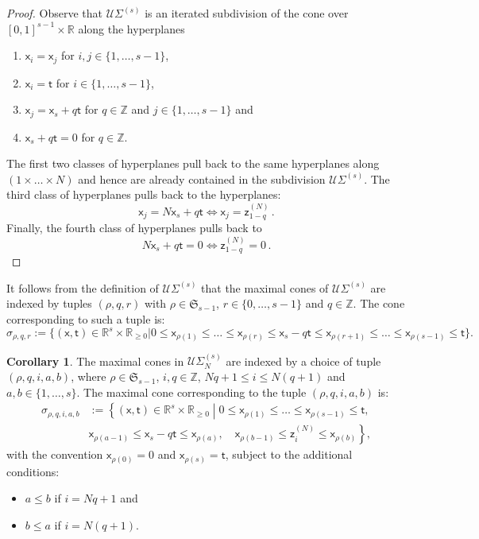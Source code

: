 \documentclass[11pt]{article}
\newcommand{\RR}{\mathbb{R}}
\theoremstyle{definition}
\newtheorem{corollary}[definition]{Corollary}
\begin{document}
\begin{proof}
	Observe that $\mathcal U\Sigma^{(s)}$ is an iterated subdivision of the
	cone over $[0,1]^{s-1}\times \mathbb{R}$ along the hyperplanes
	\begin{enumerate}[label = (\alph*)]
		\item $\mathsf{x}_i=\mathsf{x}_j$ for $i,j\in \{1,\dots,s-1\}$,
		\item $\mathsf{x}_i=\mathsf{t}$ for $i\in \{1,\dots,s-1\}$,
		\item $\mathsf{x}_j=\mathsf{x}_s+q\mathsf{t}$ for $q\in \mathbb{Z}$ and $j\in \{1,\dots,s-1\}$ and
		\item $\mathsf{x}_s+q\mathsf{t}=0$ for $q\in \mathbb{Z}$.
	\end{enumerate}
	The first two classes of hyperplanes pull back to the same
	hyperplanes along $(1\times\dots\times N)$ and hence are already
	contained in the subdivision $\mathcal U\Sigma^{(s)}$. The third class
	of hyperplanes pulls back to the hyperplanes:
	$$\mathsf{x}_j=N\mathsf{x}_s+q\mathsf{t}\Leftrightarrow \mathsf{x}_j=\mathsf{z}_{1-q}^{(N)}\,.$$
	Finally, the fourth class of hyperplanes pulls back to
	$$N\mathsf{x}_s+q\mathsf{t}=0\Leftrightarrow \mathsf{z}_{1-q}^{(N)}=0\,.$$
\end{proof}

It follows from the definition of $\mathcal U\Sigma^{(s)}$
that the maximal cones of $\mathcal U\Sigma^{(s)}$ are
indexed by tuples $(\rho,q,r)$ with $\rho\in \mathfrak S_{s-1}$, $r\in \{0,\dots,s-1\}$ and $q\in \mathbb{Z}$.
The cone corresponding to such a tuple is:
$$\sigma_{\rho,q,r}:=\{(\mathsf{x},\mathsf{t})\in \mathbb{R}^{s}\times \mathbb{R}_{\ge 0}|0\le \mathsf{x}_{\rho(1)}\le\dots \le \mathsf{x}_{\rho(r)}\le \mathsf{x}_s-q\mathsf{t}\le \mathsf{x}_{\rho(r+1)}\le \dots\le \mathsf{x}_{\rho(s-1)}\le \mathsf{t}\}.$$

\begin{corollary}
	\label{cor:max_cones_sigma_n}
	The maximal cones in $\mathcal U\Sigma_N^{(s)}$ are indexed by a choice of tuple $(\rho,q,i,a,b)$, where $\rho\in \mathfrak S_{s-1}$,
	$i,q\in \mathbb{Z}$, $Nq+1\le i\le N(q+1)$ and $a,b\in\{1,\dots,s\}$. The maximal cone corresponding to the
	tuple $(\rho,q,i,a,b)$ is:
	\begin{align*}
		\sigma_{\rho,q,i,a,b}&:=\left\{(\mathsf{x},\mathsf{t})\in \RR^s\times\RR_{\ge 0}\middle|0\le \mathsf{x}_{\rho(1)}\le\dots\le \mathsf{x}_{\rho(s-1)}\le \mathsf{t},\right.\\
							 &\left.\mathsf{x}_{\rho(a-1)}\le \mathsf{x}_s-q\mathsf{t}\le \mathsf{x}_{\rho(a)},\quad \mathsf{x}_{\rho(b-1)}\le \mathsf{z}_i^{(N)}\le \mathsf{x}_{\rho(b)}\right\},
	\end{align*}
	with the convention $\mathsf{x}_{\rho(0)}=0$ and $\mathsf{x}_{\rho(s)}=\mathsf{t}$, subject
	to the additional conditions:
	\begin{itemize}
		\item $a\le b$ if $i=Nq+1$ and
		\item $b\le a$ if $i=N(q+1)$.
	\end{itemize}
\end{corollary}
\end{document}

